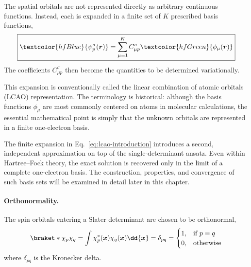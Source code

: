 \documentclass[11pt,a4paper,titlepage]{article}
\numberwithin{equation}{section}
\newcommand{\br}{\boldsymbol{r}}
\newcommand{\bx}{\boldsymbol{x}}
\newcommand{\green}[1]{\textcolor{hfGreen}{#1}}
\newcommand{\blue}[1]{\textcolor{hfBlue}{#1}}
\begin{document}
The spatial orbitals are not represented directly as arbitrary continuous
functions. Instead, each is expanded in a finite set of $K$ prescribed basis
functions,
\begin{equation}
  \boxed{
  \blue{\psi_p^\sigma(\br)}
  =
  \sum_{\mu=1}^{K}
  C_{\mu p}^{\sigma}
  \green{\phi_\mu(\br)}
  }
  \label{eq:lcao-introduction}
\end{equation}
The coefficients $C_{\mu p}^{\sigma}$ then become the quantities to be
determined variationally.

This expansion is conventionally called the linear combination of
atomic orbitals (LCAO) representation. The terminology is historical:
although the basis functions $\phi_\mu$ are most commonly centered on atoms
in molecular calculations, the essential mathematical point is simply that
the unknown orbitals are represented in a finite one-electron basis.

The finite expansion in Eq.~\eqref{eq:lcao-introduction} introduces a second,
independent approximation on top of the single-determinant ansatz. Even
within Hartree--Fock theory, the exact  solution is recovered only in the
limit of a complete one-electron basis. The construction, properties, and
convergence of such basis sets will be examined in detail later in this
chapter.

\paragraph{Orthonormality.}

The spin orbitals entering a Slater determinant are chosen to be
orthonormal,
\begin{equation}
  \braket*{\chi_p}{\chi_q}
  =
  \int
  \chi_p^*(\bx)
  \chi_q(\bx)
  \dd{\bx}
  =
  \delta_{pq}
  =
  \begin{cases}
    1,&\text{if $p=q$}\\
    0,&\text{otherwise}
  \end{cases}
\end{equation}
where $\delta_{pq}$ is the Kronecker delta.
\end{document}
